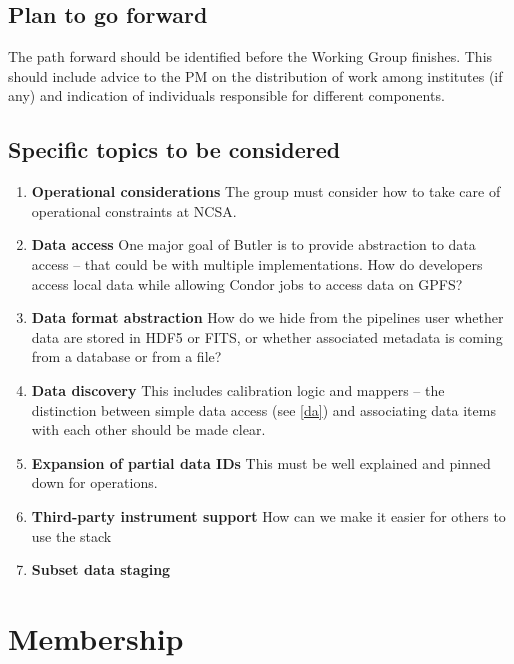 \subsection{Plan to go forward}

The path forward should be identified before the Working Group finishes.
This should include advice to the PM on the distribution of work among institutes (if any) and indication of individuals responsible for different components.

\subsection{Specific topics to be considered}

\begin{enumerate}
\item \textbf{Operational considerations}
The group must consider how to take care of operational constraints at NCSA.

\item \textbf{Data access}\label{da}
One major goal of Butler is to provide abstraction to data access -- that could be with multiple implementations.
How do developers access local data while allowing Condor jobs to access data on GPFS?

\item \textbf{Data format abstraction}
How do we hide from the pipelines user whether data are stored in HDF5 or FITS, or whether associated metadata is coming from a database or from a file?

\item \textbf{Data discovery}
This includes  calibration logic and mappers -- the distinction between simple data access (see \ref{da}) and associating data items with each other should be made clear.

\item \textbf{Expansion of partial data IDs} This must be well explained and pinned down for operations.

\item \textbf{Third-party instrument support}  How can we make it easier for others to use the stack
\item \textbf{Subset data staging}
\end{enumerate}

\section{Membership}

